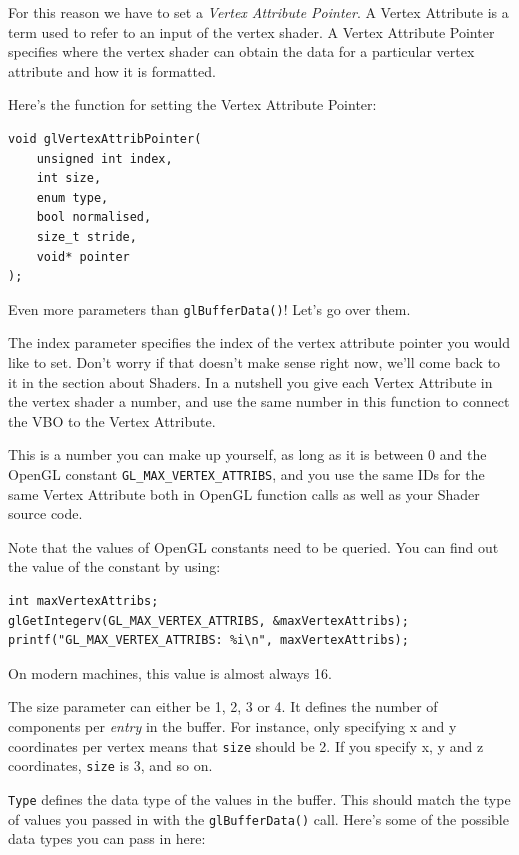 For this reason we have to set a \emph{Vertex Attribute Pointer}. A Vertex Attribute is a term used to refer to an input of the vertex shader. A Vertex Attribute Pointer specifies where the vertex shader can obtain the data for a particular vertex attribute and how it is formatted.

Here's the function for setting the Vertex Attribute Pointer:

\begin{verbatim}
void glVertexAttribPointer(
    unsigned int index, 
    int size, 
    enum type, 
    bool normalised, 
    size_t stride, 
    void* pointer
);
\end{verbatim}

Even more parameters than \texttt{glBufferData()}! Let's go over them.

The index parameter specifies the index of the vertex attribute pointer you would like to set. Don't worry if that doesn't make sense right now, we'll come back to it in the section about Shaders. In a nutshell you give each Vertex Attribute in the vertex shader a number, and use the same number in this function to connect the VBO to the Vertex Attribute.

This is a number you can make up yourself, as long as it is between 0 and the OpenGL constant \texttt{GL_MAX_VERTEX_ATTRIBS}, and you use the same IDs for the same Vertex Attribute both in OpenGL function calls as well as your Shader source code. 

Note that the values of OpenGL constants need to be queried. You can find out the value of the constant by using:

\begin{verbatim}
int maxVertexAttribs;
glGetIntegerv(GL_MAX_VERTEX_ATTRIBS, &maxVertexAttribs);
printf("GL_MAX_VERTEX_ATTRIBS: %i\n", maxVertexAttribs);
\end{verbatim}

On modern machines, this value is almost always 16.

The size parameter can either be 1, 2, 3 or 4. It defines the number of components per \emph{entry} in the buffer. For instance, only specifying x and y coordinates per vertex means that \texttt{size} should be 2. If you specify x, y and z coordinates, \texttt{size} is 3, and so on.

\texttt{Type} defines the data type of the values in the buffer. This should match the type of values you passed in with the \texttt{glBufferData()} call. Here's some of the possible data types you can pass in here:

